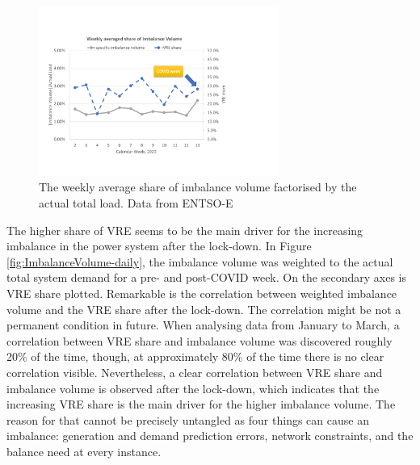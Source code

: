 \documentclass[energies,article,submit,moreauthors,pdftex]{Definitions/mdpi}
\begin{document}
\begin{figure}[H]
\centering
\hspace{-25pt}\includegraphics[trim={0cm 2cm 6.5cm 3.5cm},clip,width=0.7\textwidth]{Graphics/Illustration-Imbalance-2020.pdf}
\caption{The weekly average share of imbalance volume factorised by the actual total load. Data from ENTSO-E \protect\cite{ENTSO-E2020ENTSO-EPlatform}}
\label{fig:ImbalanceVolume_over_2020}
\end{figure} 

The higher share of VRE seems to be the main driver for the increasing imbalance in the power system after the lock-down. In Figure \ref{fig:ImbalanceVolume-daily}, the imbalance volume was weighted to the actual total system demand for a pre- and post-COVID week. On the secondary axes is VRE share plotted. Remarkable is the correlation between weighted imbalance volume and the VRE share after the lock-down. The correlation might be not a permanent condition in future. When analysing data from January to March, a correlation between VRE share and imbalance volume was discovered roughly 20\% of the time, though, at approximately 80\% of the time there is no clear correlation visible. Nevertheless, a clear correlation between VRE share and imbalance volume is observed after the lock-down, which indicates that the increasing VRE share is the main driver for the higher imbalance volume. The reason for that cannot be precisely untangled as four things can cause an imbalance: generation and demand prediction errors, network constraints, and the balance need at every instance. 
\end{document}
